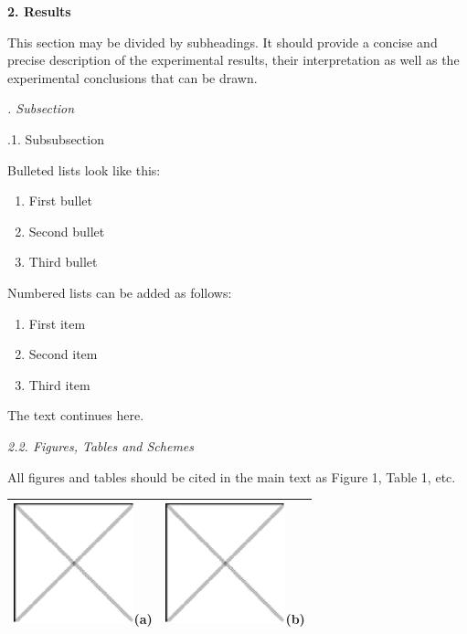 \documentclass{article} %
\begin{document}
\noindent \textbf{2. Results}

This section may be divided by subheadings. It should provide a concise and precise description of the experimental results, their interpretation as well as the experimental conclusions that can be drawn.

\noindent \textit{. Subsection}

.1. Subsubsection

Bulleted lists look like this:

\begin{enumerate}
\item  First bullet

\item  Second bullet

\item  Third bullet
\end{enumerate}

Numbered lists can be added as follows:

\begin{enumerate}
\item  First item

\item  Second item

\item  Third item
\end{enumerate}

The text continues here.

\noindent \textit{2.2. Figures, Tables and Schemes}

All figures and tables should be cited in the main text as Figure 1, Table 1, etc.

\begin{tabular}{|p{2.1in}|p{2.1in}|} \hline 
\includegraphics*[width=1.37in, height=1.37in, keepaspectratio=false]{image3}\newline (\textbf{a}) & \includegraphics*[width=1.37in, height=1.37in, keepaspectratio=false]{image4}\newline (\textbf{b}) \\ \hline 
\end{tabular}
\end{document}
